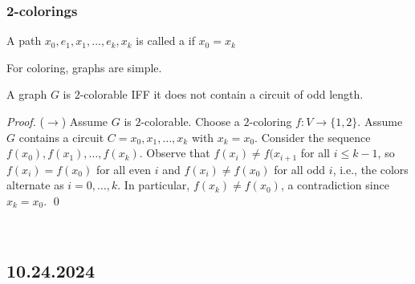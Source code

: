 \documentclass[11pt]{scrartcl}
\begin{document}
\subsubsection{2-colorings}
\begin{definition}
    A path $x_0, e_1, x_1, \dots, e_k, x_k$ is called a  if $x_0 = x_k$
\end{definition}
\begin{remark}
    For coloring, graphs are simple.
\end{remark}
\begin{theorem}
    A graph $G$ is $2$-colorable IFF it does not contain a circuit of odd length. 
\end{theorem}
\begin{proof}
    ($\rightarrow$) Assume $G$ is $2$-colorable.  Choose a $2$-coloring $f: V \rightarrow \{1, 2\}$.  Assume $G$ contains a circuit $C = x_0, x_1, \dots, x_k$ with $x_k = x_0$. Consider the sequence $f(x_0), f(x_1), \dots, f(x_k)$.  Observe that $f(x_i) \neq f(x_{i+1}$ for all $i \leq k-1$, so $f(x_i) = f(x_0)$ for all even $i$ and $f(x_i) \neq f(x_0)$ for all odd $i$, i.e., the colors alternate as $i = 0, \dots, k$.  In particular, $f(x_k) \neq f(x_0)$, a contradiction since $x_k = x_0$. \qed 
\end{proof}
\noindent
\Line
\\
\subsection{10.24.2024}
\end{document}
